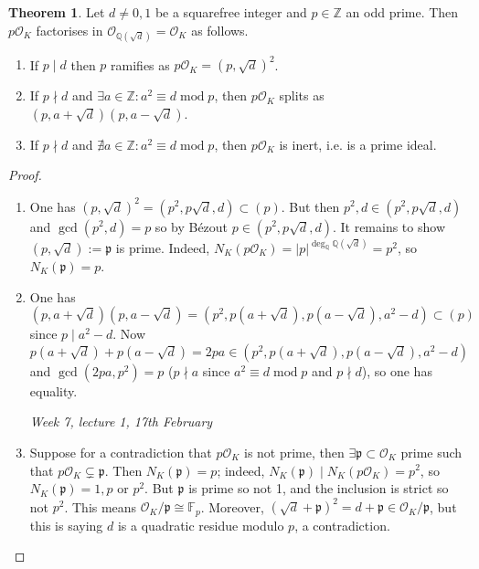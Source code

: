 \documentclass{article}
\newcommand{\Z}{\mathbb{Z}}
\newcommand{\Q}{\mathbb{Q}}
\newcommand{\F}{\mathbb{F}}
\newcommand{\Mod}{\operatorname{mod}}
\newcommand{\ri}{\mathcal{O}}
\newcommand{\ip}{\mathfrak{p}}
\theoremstyle{definition}
\newtheorem{thm}[defn]{Theorem}
\begin{document}
\begin{thm}
\label{thm:quadramoddp}
Let $d\neq 0,1$ be a squarefree integer and $p\in\Z$ an odd prime. Then $p\ri_K$ factorises in $\ri_{\Q\left(\sqrt d\right)}=\ri_K$ as follows.
\begin{enumerate}
\item If $p\mid d$ then $p$ ramifies as $p\ri_K=\left(p,\sqrt d\right)^2$.
\item If $p\nmid d$ and $\exists a\in\Z:a^2\equiv d\Mod p$, then $p\ri_K$ splits as $\left(p,a+\sqrt d\right)\left(p,a-\sqrt d\right)$.
\item If $p\nmid d$ and $\nexists a\in\Z:a^2\equiv d\Mod p$, then $p\ri_K$ is inert, i.e. is a prime ideal.
\end{enumerate}
\end{thm}
\begin{proof}
\begin{enumerate}
\item One has $\left(p,\sqrt d\right)^2=\left(p^2,p\sqrt d,d\right)\subset (p)$. But then $p^2,d\in\left(p^2,p\sqrt d,d\right)$ and $\gcd (p^2,d)=p$ so by Bézout $p\in \left(p^2,p\sqrt d,d\right)$. It remains to show $\left(p,\sqrt d\right):=\ip$ is prime. Indeed, $N_K(p\ri_K)=|p|^{\deg_\Q\Q\left(\sqrt d\right)}=p^2$, so $N_K(\ip)=p$.
\item One has
\[
\left(p,a+\sqrt d\right)\left(p,a-\sqrt d\right)=\left(p^2,p\left(a+\sqrt d\right),p\left(a-\sqrt d\right),a^2-d\right)\subset(p)
\]
since $p\mid a^2-d$. Now $p\left(a+\sqrt d\right)+p\left(a-\sqrt d\right)=2pa\in\left(p^2,p\left(a+\sqrt d\right),p\left(a-\sqrt d\right),a^2-d\right)$ and $\gcd(2pa,p^2)=p$ ($p\nmid a$ since $a^2\equiv d\Mod p$ and $p\nmid d$), so one has equality.

\begin{flushright}
\textit{Week 7, lecture 1, 17th February}
\end{flushright}

\item Suppose for a contradiction that $p\ri_K$ is not prime, then $\exists\ip\subset\ri_K$ prime such that $p\ri_K\subsetneq\ip$. Then $N_K(\ip)=p$; indeed, $N_K(\ip)\mid N_K(p\ri_K)=p^2$, so $N_K(\ip)=1,p$ or $p^2$. But $\ip$ is prime so not 1, and the inclusion is strict so not $p^2$. This means $\ri_K/\ip\cong\F_p$. Moreover, $\left(\sqrt d+\ip\right)^2=d+\ip\in\ri_K/\ip$, but this is saying $d$ is a quadratic residue modulo $p$, a contradiction.
\end{enumerate}
\end{proof}
\end{document}
